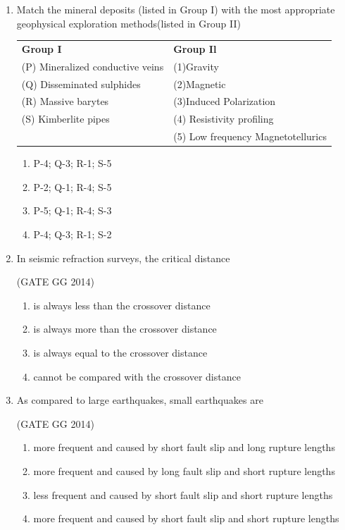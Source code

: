 \documentclass[journal]{IEEEtran}
\begin{document}
\begin{enumerate}[start=1]
\item Match the mineral deposits (listed in Group I) with the most appropriate geophysical exploration methods(listed in Group II)
\hspace*{15.7cm}{(GATE GG 2014)}\\
\begin{tabular}{ l l }
\textbf{Group I} & \textbf{Group Il}\\
(P) Mineralized conductive veins & (1)Gravity\\
(Q) Disseminated sulphides & (2)Magnetic\\
(R) Massive barytes & (3)Induced Polarization\\
(S) Kimberlite pipes & (4) Resistivity profiling\\
 & (5) Low frequency Magnetotellurics
 \end{tabular}
 \begin{multicols}{2}
     \begin{enumerate}
    \item  P-4; Q-3; R-1; S-5
    \item  P-2; Q-1; R-4; S-5
    \item P-5; Q-1; R-4; S-3
    \item P-4; Q-3; R-1; S-2
\end{enumerate}
 \end{multicols}


\item  In seismic refraction surveys, the critical distance

\hfill{(GATE GG 2014)}\\
\begin{enumerate}
    \item is always less than the crossover distance
\item  is always more than the crossover distance
\item  is always equal to the crossover distance
\item  cannot be compared with the crossover distance

\end{enumerate}

\item As compared to large earthquakes, small earthquakes are

\hfill{(GATE GG 2014)}\\
\begin{enumerate}
    \item  more frequent and caused by short fault slip and long rupture lengths
\item  more frequent and caused by long fault slip and short rupture lengths
\item  less frequent and caused by short fault slip and short rupture lengths
\item  more frequent and caused by short fault slip and short rupture lengths
\end{enumerate}


\end{enumerate}
\end{document}

